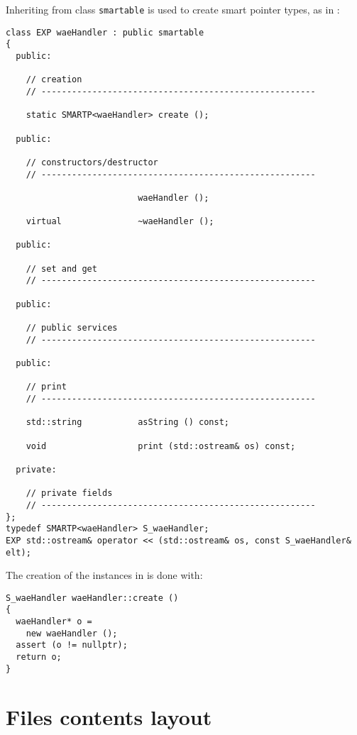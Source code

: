 Inheriting from class   {\tt smartable} is used to create smart pointer types, as in :
\begin{lstlisting}[language=CPlusPlus]
class EXP waeHandler : public smartable
{
  public:

    // creation
    // ------------------------------------------------------

    static SMARTP<waeHandler> create ();

  public:

    // constructors/destructor
    // ------------------------------------------------------

                          waeHandler ();

    virtual               ~waeHandler ();

  public:

    // set and get
    // ------------------------------------------------------

  public:

    // public services
    // ------------------------------------------------------

  public:

    // print
    // ------------------------------------------------------

    std::string           asString () const;

    void                  print (std::ostream& os) const;

  private:

    // private fields
    // ------------------------------------------------------
};
typedef SMARTP<waeHandler> S_waeHandler;
EXP std::ostream& operator << (std::ostream& os, const S_waeHandler& elt);
\end{lstlisting}

The creation of the instances in  is done with:
\begin{lstlisting}[language=CPlusPlus]
S_waeHandler waeHandler::create ()
{
  waeHandler* o =
    new waeHandler ();
  assert (o != nullptr);
  return o;
}
\end{lstlisting}


\section{Files contents layout}

